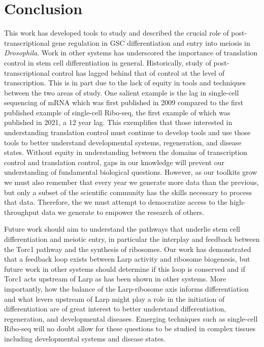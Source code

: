 \documentclass[12pt,oneside]{reedthesis}
\begin{document}

\hypertarget{conclusion}{%
\chapter{Conclusion}\label{conclusion}}

This work has developed tools to study and described the crucial role of post-transcriptional gene regulation in GSC differentiation and entry into meiosis in \emph{Drosophila}. Work in other systems has underscored the importance of translation control in stem cell differentiation in general. Historically, study of post-transcriptional control has lagged behind that of control at the level of transcription. This is in part due to the lack of equity in tools and techniques between the two areas of study. One salient example is the lag in single-cell sequencing of mRNA which was first published in 2009 compared to the first published example of single-cell Ribo-seq, the first example of which was published in 2021, a 12 year lag. This exemplifies that those interested in understanding translation control must continue to develop tools and use those tools to better understand developmental systems, regeneration, and disease states. Without equity in understanding between the domains of transcription control and translation control, gaps in our knowledge will prevent our understanding of fundamental biological questions. However, as our toolkits grow we must also remember that every year we generate more data than the previous, but only a subset of the scientific community has the skills necessary to process that data. Therefore, the we must attempt to democratize access to the high-throughput data we generate to empower the research of others.

Future work should aim to understand the pathways that underlie stem cell differentiation and meiotic entry, in particular the interplay and feedback between the Torc1 pathway and the synthesis of ribosomes. Our work has demonstrated that a feedback loop exists between Larp activity and ribosome biogenesis, but future work in other systems should determine if this loop is conserved and if Torc1 acts upstream of Larp as has been shown in other systems. More importantly, how the balance of the Larp-ribosome axis informs differentiation and what levers upstream of Larp might play a role in the initiation of differentiation are of great interest to better understand differentiation, regeneration, and developmental diseases. Emerging techniques such as single-cell Ribo-seq will no doubt allow for these questions to be studied in complex tissues including developmental systems and disease states.
\end{document}
